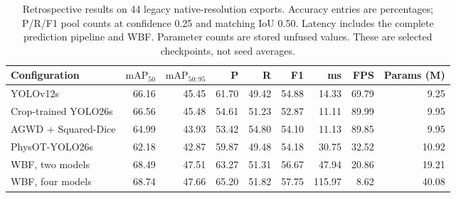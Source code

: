 \begin{table}[!t]
\centering
\caption{Retrospective results on 44 legacy native-resolution exports. Accuracy
entries are percentages; P/R/F1 pool counts at confidence 0.25 and matching IoU
0.50. Latency includes the complete prediction pipeline and WBF. Parameter
counts are stored unfused values. These are selected checkpoints, not seed averages.}
\label{tab:native}
\small\setlength{\tabcolsep}{4pt}
\begin{tabular}{lrrrrrrrr}
\toprule
Configuration & $\mathrm{mAP}_{50}$ & $\mathrm{mAP}_{50:95}$ & P & R & F1
& ms & FPS & Params (M)\\
\midrule
YOLOv12s & 66.16 & 45.45 & 61.70 & 49.42 & 54.88 & 14.33 & 69.79 & 9.25 \\
Crop-trained YOLO26s & 66.56 & 45.48 & 54.61 & 51.23 & 52.87 & 11.11 & 89.99 & 9.95 \\
AGWD + Squared-Dice & 64.99 & 43.93 & 53.42 & 54.80 & 54.10 & 11.13 & 89.85 & 9.95 \\
PhysOT-YOLO26s & 62.18 & 42.87 & 59.87 & 49.48 & 54.18 & 30.75 & 32.52 & 10.92 \\
WBF, two models & 68.49 & 47.51 & 63.27 & 51.31 & 56.67 & 47.94 & 20.86 & 19.21 \\
WBF, four models & 68.74 & 47.66 & 65.20 & 51.82 & 57.75 & 115.97 & 8.62 & 40.08 \\
\bottomrule
\end{tabular}
\end{table}
